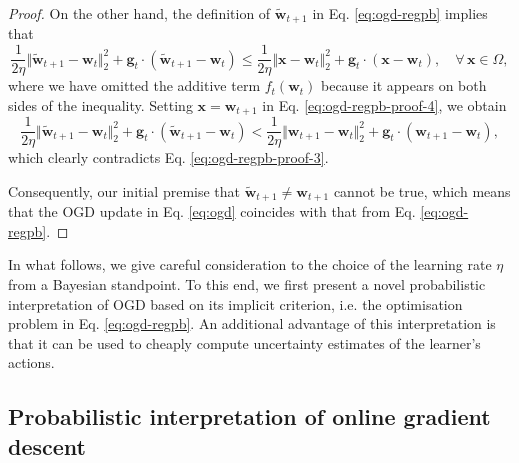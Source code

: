 \begin{proof}
On the other hand, the definition of $\widetilde{\mathbf{w}}_{t+1}$ in Eq. \eqref{eq:ogd-regpb} implies that
\begin{equation}
\label{eq:ogd-regpb-proof-4}
	\frac{1}{2\eta}\Vert\widetilde{\mathbf{w}}_{t+1} - \mathbf{w}_t\Vert_2^2 + \mathbf{g}_t \cdot (\widetilde{\mathbf{w}}_{t+1} - \mathbf{w}_t)
	\leq \frac{1}{2\eta}\Vert\mathbf{x} - \mathbf{w}_t\Vert_2^2 + \mathbf{g}_t \cdot (\mathbf{x} - \mathbf{w}_t), \quad \forall \, \mathbf{x} \in \Omega,
\end{equation}
where we have omitted the additive term $f_t(\mathbf{w}_t)$ because it appears on both sides of the inequality. Setting $\mathbf{x} = \mathbf{w}_{t+1}$ in Eq. \eqref{eq:ogd-regpb-proof-4}, we obtain
\begin{equation}
\label{eq:ogd-regpb-proof-5}
	\frac{1}{2\eta}\Vert\widetilde{\mathbf{w}}_{t+1} - \mathbf{w}_t\Vert_2^2 + \mathbf{g}_t \cdot (\widetilde{\mathbf{w}}_{t+1} - \mathbf{w}_t)
	< \frac{1}{2\eta}\Vert\mathbf{w}_{t+1} - \mathbf{w}_t\Vert_2^2 + \mathbf{g}_t \cdot (\mathbf{w}_{t+1} - \mathbf{w}_t),
\end{equation}
which clearly contradicts Eq. \eqref{eq:ogd-regpb-proof-3}.

Consequently, our initial premise that $\widetilde{\mathbf{w}}_{t+1} \neq \mathbf{w}_{t+1}$ cannot be true, which means that the OGD update in Eq. \eqref{eq:ogd} coincides with that from Eq. \eqref{eq:ogd-regpb}.
\end{proof}
In what follows, we give careful consideration to the choice of the learning rate $\eta$ from a Bayesian standpoint. To this end, we first present a novel probabilistic interpretation of OGD based on its implicit criterion, i.e. the optimisation problem in Eq. \eqref{eq:ogd-regpb}. An additional advantage of this interpretation is that it can be used to cheaply compute uncertainty estimates of the learner's actions.

\subsection{Probabilistic interpretation of online gradient descent}
\label{sec:probabilistic-ogd}

